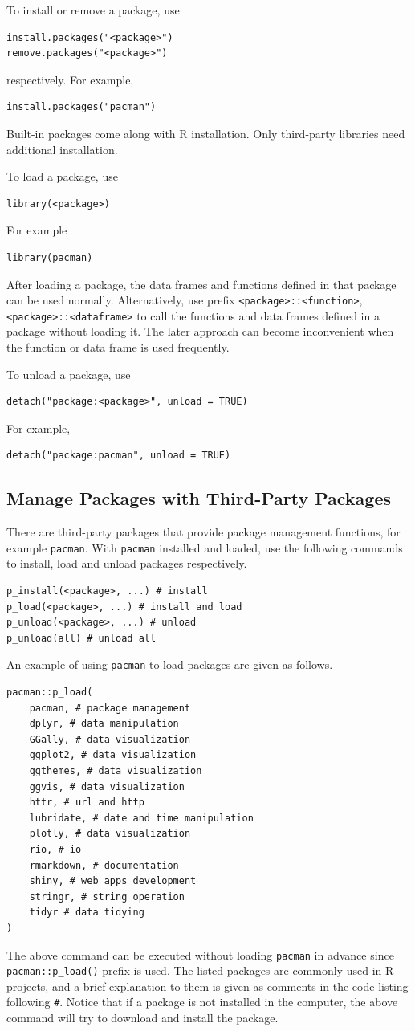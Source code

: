 To install or remove a package, use
\begin{lstlisting}
install.packages("<package>")
remove.packages("<package>")
\end{lstlisting}
respectively. For example,
\begin{lstlisting}
install.packages("pacman")
\end{lstlisting}
Built-in packages come along with R installation. Only third-party libraries need additional installation.

To load a package, use
\begin{lstlisting}
library(<package>)
\end{lstlisting}
For example
\begin{lstlisting}
library(pacman)
\end{lstlisting}
After loading a package, the data frames and functions defined in that package can be used normally. Alternatively, use prefix \verb|<package>::<function>|, \verb|<package>::<dataframe>| to call the functions and data frames defined in a package without loading it. The later approach can become inconvenient when the function or data frame is used frequently. 

To unload a package, use
\begin{lstlisting}
detach("package:<package>", unload = TRUE)
\end{lstlisting}
For example,
\begin{lstlisting}
detach("package:pacman", unload = TRUE)
\end{lstlisting}

\subsection{Manage Packages with Third-Party Packages}

There are third-party packages that provide package management functions, for example \verb|pacman|. With \verb|pacman| installed and loaded, use the following commands to install, load and unload packages respectively.
\begin{lstlisting}
p_install(<package>, ...) # install
p_load(<package>, ...) # install and load
p_unload(<package>, ...) # unload
p_unload(all) # unload all
\end{lstlisting}
An example of using \verb|pacman| to load packages are given as follows.
\begin{lstlisting}
pacman::p_load(
	pacman, # package management
	dplyr, # data manipulation
	GGally, # data visualization
	ggplot2, # data visualization
	ggthemes, # data visualization
	ggvis, # data visualization
	httr, # url and http
	lubridate, # date and time manipulation
	plotly, # data visualization
	rio, # io
	rmarkdown, # documentation
	shiny, # web apps development
	stringr, # string operation
	tidyr # data tidying
)
\end{lstlisting}
The above command can be executed without loading \verb|pacman| in advance since \verb|pacman::p_load()| prefix is used. The listed packages are commonly used in R projects, and a brief explanation to them is given as comments in the code listing following \verb|#|. Notice that if a package is not installed in the computer, the above command will try to download and install the package.

